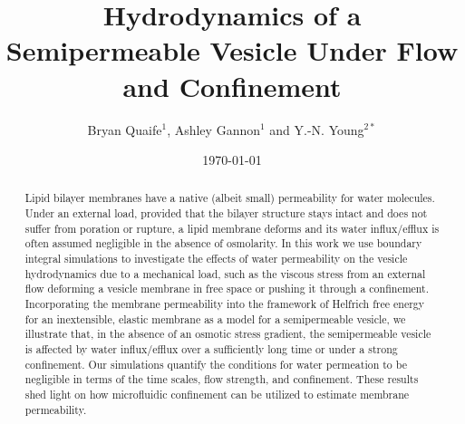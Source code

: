 \documentclass[prb,preprint,showpacs,preprintnumbers,amsmath,amssymb,longbibliography]{revtex4-1}
\begin{document}
\title{Hydrodynamics of a  Semipermeable Vesicle Under Flow and
Confinement}

\author{Bryan Quaife$^{1}$, Ashley Gannon$^{1}$ and Y.-N. Young$^{2*}$}

\date{\today}


\begin{abstract}
Lipid bilayer membranes have a native (albeit small) permeability for
water molecules. Under an external load, 
provided that the bilayer structure stays intact and does
not suffer from poration or rupture,
a lipid membrane deforms and
its water influx/efflux is often assumed negligible in the absence of
osmolarity. 
%
In this work we use boundary integral simulations to investigate the
effects of water permeability on the vesicle hydrodynamics due to
a mechanical load, such as the viscous stress from an external flow
deforming a vesicle membrane in free space or pushing it through a
confinement. Incorporating the membrane permeability into the framework of Helfrich free energy for an inextensible, elastic membrane as a model for a semipermeable vesicle, we
illustrate that, in the absence of an osmotic stress gradient, the
semipermeable vesicle is affected by water influx/efflux over a
sufficiently long time or under a strong confinement. Our simulations
quantify the conditions for water permeation to be negligible in terms
of the time scales, flow strength, and confinement. These results shed
light on how microfluidic confinement can be utilized to estimate
membrane permeability.
\end{abstract}

                              
                              
\maketitle
\end{document}

